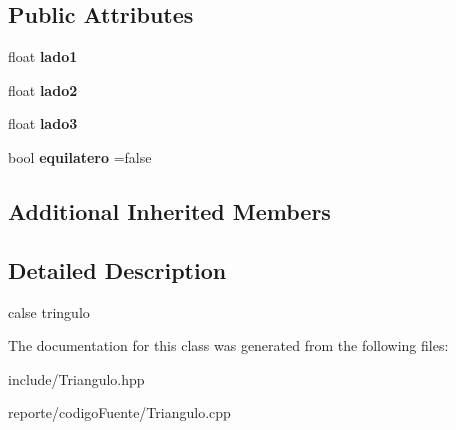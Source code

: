 \subsection*{Public Attributes}
\begin{DoxyCompactItemize}
\item 
\mbox{\label{classtriangulo_a938be48c572df73b6cc2aa18f83b83c4}} 
float {\bfseries lado1}
\item 
\mbox{\label{classtriangulo_ab4441e41406099469c085abb287f9b8c}} 
float {\bfseries lado2}
\item 
\mbox{\label{classtriangulo_aff3acd0f532f7c2e8bac5c2709124433}} 
float {\bfseries lado3}
\item 
\mbox{\label{classtriangulo_aacb96b1b6b60488b47bfcd422e0530ba}} 
bool {\bfseries equilatero} =false
\end{DoxyCompactItemize}
\subsection*{Additional Inherited Members}


\subsection{Detailed Description}
calse tringulo 

The documentation for this class was generated from the following files\+:\begin{DoxyCompactItemize}
\item 
include/Triangulo.\+hpp\item 
reporte/codigo\+Fuente/Triangulo.\+cpp\end{DoxyCompactItemize}
